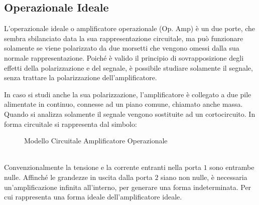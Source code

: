 \documentclass{article}
\numberwithin{equation}{subsection}
\begin{document}
\subsection{Operazionale Ideale}

L'operazionale ideale o amplificatore operazionale (Op. Amp) è un due porte, che sembra sbilanciato data la sua rappresentazione circuitale, ma può funzionare solamente se 
viene polarizzato da due morsetti che vengono omessi dalla sua normale rappresentazione. Poiché è valido il principio di sovrapposizione degli effetti della polarizzazione 
e del segnale, è possibile studiare solamente il segnale, senza trattare la polarizzazione dell'amplificatore. 


In caso si studi anche la sua polarizzazione, l'amplificatore è collegato a due pile alimentate in continuo, connesse ad un piano comune, chiamato anche massa. Quando si analizza 
solamente il segnale vengono sostituite ad un cortocircuito. 
In forma circuitale si rappresenta dal simbolo:
\begin{figure}[!h]
    \centering
    \qquad
    \caption{Modello Circuitale Amplificatore Operazionale}
    \label{fig:op-amp}
\end{figure}
\\
Convenzionalmente la tensione e la corrente entranti nella porta $1$ sono entrambe nulle. Affinché le grandezze in uscita dalla porta $2$ siano non nulle, è necessaria un'amplificazione 
infinita all'interno, per generare una forma indeterminata. Per cui rappresenta una forma ideale dell'amplificatore ideale. 



\clearpage
\end{document}
